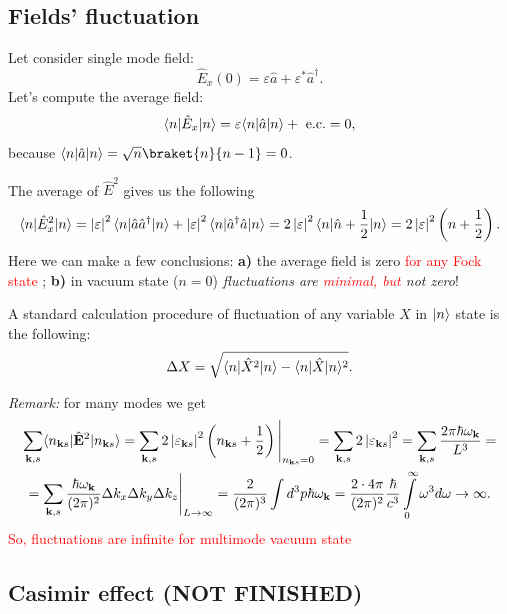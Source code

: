 	\subsection{Fields' fluctuation}
	
	Let consider single mode field:
	\begin{equation}
		\hat{E}_x(0) = \varepsilon \hat{a} + \varepsilon^* \hat{a}^{\dagger}.
	\end{equation}
	Let's compute the average field:
	\begin{equation}
		\langle n\rvert \hat{E}_x \lvert n\rangle = \varepsilon \langle n\rvert \hat{a} \lvert n\rangle + \text{ e.c.} = 0,
	\end{equation}
	because $\bra{n} \hat{a} \ket{n} = \sqrt{n} \braket{n}{n-1} = 0$.
	
	The average of $\hat{E}^2$ gives us the following
	\begin{equation}
		\langle n\rvert \hat{E}^2_x \lvert n\rangle = \left| \varepsilon \right|^2 \langle n\rvert \hat{a} \hat{a}^{\dagger} \lvert n\rangle + \left| \varepsilon \right|^2 \langle n\rvert \hat{a}^{\dagger} \hat{a} \lvert n\rangle = 2 \left| \varepsilon \right|^2 \langle n\rvert \hat{n} + \frac{1}{2} \lvert n\rangle = 2 \left| \varepsilon \right|^2 \left( n + \frac{1}{2} \right).
	\end{equation}
	Here we can make a few conclusions: \textbf{a)} the average field is zero {\textcolor{red}{ for any Fock state }}; \textbf{b)} in vacuum state ($n=0$) \textit{fluctuations are {\textcolor{red}{ minimal, but }} not zero}!
	
	
	A standard calculation procedure of fluctuation of any variable $X$ in $\lvert n\rangle$ state is the following:
	\begin{equation}
		\Delta X = \sqrt{\langle n\rvert \hat{X}^2 \lvert n\rangle - \langle n\rvert \hat{X} \lvert n\rangle^2 }.
	\end{equation}
	
	\textit{Remark:} for many modes we get 
	\begin{multline}
		\sum_{\mathbf{k},s} \langle n_{\mathbf{k}s}\rvert \hat{\mathbf{E}}^2 \lvert n_{\mathbf{k}s}\rangle = \sum_{\mathbf{k},s} 2 \left| \varepsilon_{\mathbf{k}s} \right|^2 \left( n_{\mathbf{k}s} + \frac{1}{2} \right) \Bigg|_{n_{\mathbf{k}s} = 0}  =  \sum_{\mathbf{k},s} 2 \left| \varepsilon_{\mathbf{k}s} \right|^2  =
		\sum_{\mathbf{k},s} \frac{2 \pi \hbar \omega_{\mathbf{k}}}{L^3} = \\ = \sum_{\mathbf{k},s} \frac{\hbar \omega_{\mathbf{k}}}{(2 \pi)^2} \Delta k_x \Delta k_y \Delta k_z \Bigg|_{L \to \infty} = \frac{2}{(2 \pi)^3} \int d^3 p \hbar \omega_{\mathbf{k}} = \frac{2 \cdot 4 \pi}{(2 \pi)^2} \frac{\hbar}{c^3} \int \limits_0^{\infty} \omega^3 d  \omega \to \infty.
	\end{multline}
{\textcolor{red}{ So, fluctuations are infinite for multimode vacuum state }} 
	
	\subsection{Casimir effect (NOT FINISHED)} 